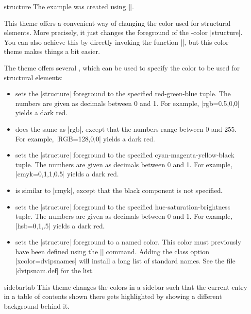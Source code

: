 \begin{colorthemeexample}{structure}
  The example was created using ||.

  This theme offers a convenient way of changing the color used for
  structural elements. More precisely, it just changes the foreground
  of the \beamer-color |structure|. You can also achieve this by
  directly invoking the function |\setbeamercolor|, but this color
  theme makes things a bit easier.

  The theme offers several , which can be used to
  specify the color to be used for structural elements:
  \begin{itemize}
  \item
     sets the |structure| foreground
    to the specified red-green-blue tuple. The numbers are given as
    decimals between 0 and 1. For example, |rgb={0.5,0,0}| yields a
    dark red.
  \item
     does the same as |rgb|, except
    that the numbers range between 0 and 255. For example,
    |RGB={128,0,0}|  yields a dark red.
  \item
     sets the |structure| foreground
    to the specified cyan-magenta-yellow-black tuple. The numbers are
    given as decimals between 0 and 1. For example, |cmyk={0,1,1,0.5}|
    yields a dark red.
  \item
     is similar to |cmyk|, except that
    the black component is not specified.
  \item
      sets the |structure| foreground
    to the specified hue-saturation-brightness tuple. The numbers are
    given as decimals between 0 and 1. For example, |hsb={0,1,.5}|
    yields a dark red.
  \item
     sets the |structure| foreground
    to a named color. This color must previously have been defined
    using the |\DefineNamedColor| command. Adding the class option
    |xcolor=dvipsnames| will install a long list of standard
    names. See the file |dvipsnam.def| for the list.
  \end{itemize}
\end{colorthemeexample}

\begin{colorthemeexample}{sidebartab}
  This theme changes the colors in a sidebar such that the current
  entry in a table of contents shown there gets highlighted by showing a
  different background behind it.
\end{colorthemeexample}



